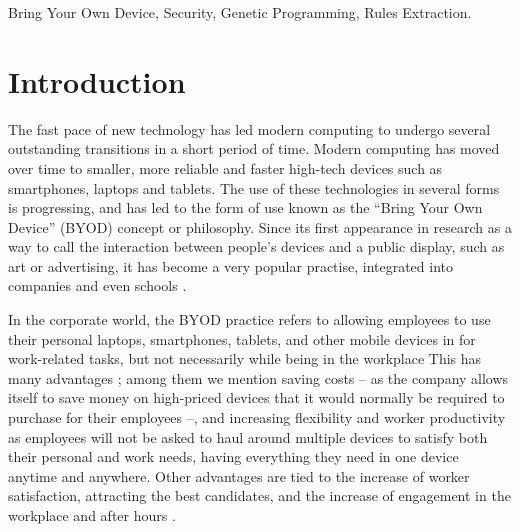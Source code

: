 \documentclass[a4paper,10pt,twocolumn,preprint,3p]{elsarticle}
\begin{document}
\begin{frontmatter}
\begin{keyword}
Bring Your Own Device, Security, Genetic Programming, Rules Extraction. 
\end{keyword}

\end{frontmatter}


\section{Introduction}
\label{sec:intro}

The fast pace of new technology has led modern computing to undergo
several outstanding transitions in a short period of time. Modern
computing has moved over time to smaller, more reliable and faster
high-tech devices such as smartphones, laptops and tablets. The use of
these technologies in several forms is progressing, and has led to the
form of use known as the ``Bring Your Own Device'' (BYOD) concept or
philosophy. %
Since its first appearance in research
\cite{ballagas2004byod} as a way to call the interaction between
people's devices and a public display, such as art or advertising, it
has become a very popular practise, integrated into companies
\cite{thomson2012byod} and even schools \cite{song2014bring}.  

In the corporate world, the BYOD
practice refers to allowing employees to use their
personal laptops, smartphones, tablets, and other mobile devices in
for work-related tasks, but not necessarily while being in the workplace This has many
advantages \cite{singh2012byod}; among them we mention saving costs --
as the company allows itself to save money on high-priced devices that
it would normally be required to purchase for their employees --, and
increasing flexibility and worker productivity as employees will not
be asked to haul around multiple devices to satisfy both their personal and
work needs, having everything they need in one device anytime and
anywhere. 
Other advantages are tied to the increase of worker satisfaction, attracting the best candidates, and the increase of engagement in the workplace and after hours \cite{singh2012byod}. %
\end{document}
